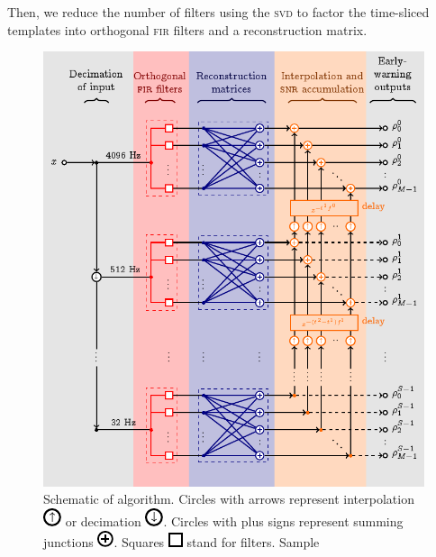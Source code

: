 \documentclass[portrait,plainboxedsections]{sciposter}
\begin{document}
\begin{minipage}[t]{0.4\textwidth}
{Then, we reduce the number of filters using the \textsc{svd}
to factor the time-sliced templates
into orthogonal \textsc{fir} filters and a reconstruction matrix.
}
\begin{figure}[h!]
	\begin{center}
		\includegraphics[width=\textwidth]{figures/lloid-diagram}
		\caption{\label{fig:pipeline} Schematic of \lloid{} algorithm.
		Circles with arrows represent interpolation
\protect\includegraphics[scale=3]{figures/upsample-symbol} or decimation
\protect\includegraphics[scale=3]{figures/downsample-symbol}.  Circles with plus
signs represent summing junctions
\protect\includegraphics[scale=3]{figures/adder-symbol}.  Squares
\protect\includegraphics[scale=3]{figures/fir-symbol} stand for \fir{} filters.  Sample
}
\end{center}
\end{figure}
\end{minipage}
\end{document}
